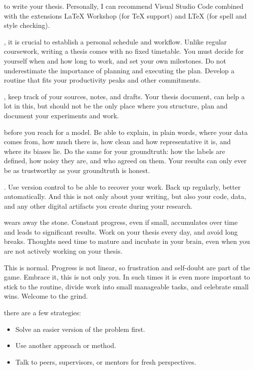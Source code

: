 \documentclass{../sharedAssets/tufte}
\begin{document}
 to write your thesis. Personally, I can recommend Visual Studio Code combined with the extensions LaTeX Workshop (for TeX support)
and LTeX (for spell and style checking). 

, it is crucial to establish a personal schedule and workflow. 
Unlike regular coursework, writing a thesis comes with no fixed timetable.
 You must decide for yourself when and how long to work, and set your own milestones. 
 Do not underestimate the importance of planning and executing the plan. 
 Develop a routine that fits your productivity peaks and other commitments. 

, keep track of your sources, notes, and drafts. Your thesis document, can help a lot in this, 
but should not be the only place where you structure, plan and document your experiments and work.

 before you reach for a model. Be able to explain, in plain words, where your data comes from, how much there is, how clean and how representative it is, and where its biases lie. Do the same for your groundtruth: how the labels are defined, how noisy they are, and who agreed on them. Your results can only ever be as trustworthy as your groundtruth is honest.

. Use version control to be able to recover your work. Back up regularly, better automatically.
And this is not only about your writing, but also your code, data, and any other digital artifacts you create during your research.

 wears away the stone. Constant progress, even if small, accumulates over time and leads to significant results.
Work on your thesis every day, and avoid long breaks. Thoughts need time to mature and incubate in your brain, 
even when you are not actively working on your thesis.

 This is normal. Progress is not linear, so frustration and self-doubt are part of the game. Embrace it, this is not only you.
In such times it is even more important to stick to the routine, divide work into small manageable tasks, and celebrate small wins. Welcome to the grind. 

 there are a few strategies:
\begin{itemize}
  \item Solve an easier version of the problem first.
  \item Use another approach or method.
  \item Talk to peers, supervisors, or mentors for fresh perspectives.
\end{itemize}
\end{document}
